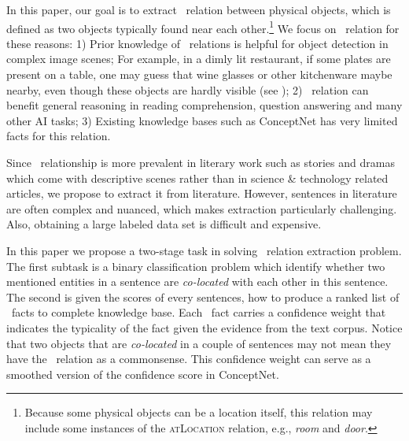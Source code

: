 In this paper, our goal is to extract \lnear\ relation between
physical objects, which is defined as two objects typically found near each
other.\footnote{Because some physical objects can be a location itself, this
relation may include some instances of the \textsc{atLocation} relation,
e.g., {\em room} and {\em door}.}
We focus on \lnear\ relation for these reasons: 1) Prior knowledge of \lnear\ relations is helpful for object detection in complex image scenes; 
For example, in a dimly lit restaurant, if some plates are present on a table,
one may guess that wine glasses or other kitchenware maybe nearby, 
even though these objects are hardly visible (see );
2) \lnear~relation can benefit general reasoning in reading comprehension, question answering and many other AI tasks;
3) Existing knowledge bases such as ConceptNet has very limited facts for this relation.


  

Since \lnear\ relationship is more prevalent in literary work such as stories 
	and dramas which come with descriptive scenes rather
	than in science \& technology related articles,
we propose to extract it from literature.
However, sentences in literature are often complex and nuanced, 
which makes extraction particularly challenging. 
Also, obtaining a large labeled data set is difficult and expensive.



In this paper we propose a two-stage task in solving \lnear\ relation
extraction problem. 
The first subtask is a binary classification problem which identify whether two mentioned entities in a sentence are {\em co-located} with each other in this sentence. 
The second is given the scores of every sentences, how to produce a ranked list of \lnear\
facts to complete knowledge base. Each \lnear\ fact carries a confidence weight
that indicates the typicality of the fact given the evidence from the
text corpus. Notice that two objects that are {\em co-located} 
in a couple of sentences may not mean they have 
the \lnear\ relation as a commonsense. This confidence weight can serve
as a smoothed version of the confidence score in ConceptNet.

